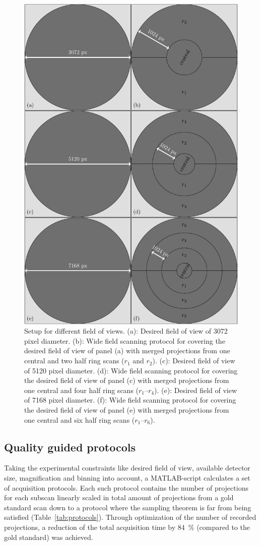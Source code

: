 \begin{figure}[p]
	\centering
	\includegraphics[width=.8\linewidth]{img/Haberthuer2010/Fig03-3-5-7}
	\caption[Setup for different field of views]{Setup for different field of views. %
		(a): Desired field of view of 3072 pixel diameter. %
		(b): Wide field scanning protocol for covering the desired field of view of panel (a) with merged projections from one central and two half ring scans ($r_{1}$ and $r_{2}$). %
		(c): Desired field of view of 5120 pixel diameter. %
		(d): Wide field scanning protocol for covering the desired field of view of panel (c) with merged projections from one central and four half ring scans ($r_{1}$--$r_{4}$). %
		(e): Desired field of view of 7168 pixel diameter. %
		(f): Wide field scanning protocol for covering the desired field of view of panel (e) with merged projections from one central and six half ring scans ($r_{1}$--$r_{6}$).}%
	\label{fig:SubScan-Setup}
\end{figure}

\subsection{Quality guided protocols}\label{sec:quality guided protocols}
Taking the experimental constraints like desired field of view, available detector size, magnification and binning into account, a MATLAB-script calculates a set of acquisition protocols. Each such protocol contains the number of projections for each subscan linearly scaled in total amount of projections from a gold standard scan down to a protocol where the sampling theorem is far from being satisfied (Table~\ref{tab:protocols}). Through optimization of the number of recorded projections, a reduction of the total acquisition time by \SI{84}{\percent} (compared to the gold standard) was achieved.

